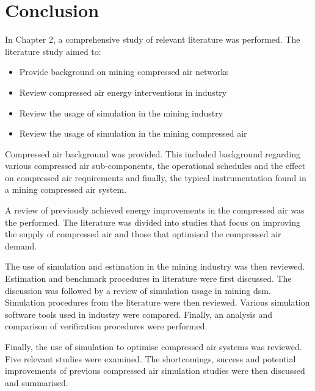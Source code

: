 \section{Conclusion}
In Chapter 2, a comprehensive study of relevant literature was performed. The literature study aimed to:
\begin{itemize}
	\item Provide background on mining compressed air networks
	\item Review compressed air energy interventions in industry
	\item Review the usage of simulation in the mining industry 
	\item Review the usage of simulation in the mining compressed air
\end{itemize}
Compressed air background was provided. This included background regarding various compressed air sub-components, the operational schedules and the effect on compressed air requirements and finally, the typical instrumentation found in a mining compressed air system.
\par
A review of previously achieved energy improvements in the compressed air was the performed. The literature was divided into studies that focus on improving the supply of compressed air and those that optimised the compressed air demand.
\par
The use of simulation and estimation in the mining industry was then reviewed. Estimation and benchmark procedures in literature were first discussed. The discussion was followed by a review of simulation usage in mining \gls{dsm}. Simulation procedures from the literature were then reviewed. Various simulation software tools used in industry were compared. Finally, an analysis and comparison of verification procedures were performed.
\par 
	Finally, the use of simulation to optimise compressed air systems was reviewed.  Five relevant studies were examined. The shortcomings, success and potential improvements of previous compressed air simulation studies were then discussed and summarised.